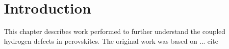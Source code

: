 \section{Introduction}
\label{sec:perovskites-introduction}

This chapter describes work performed to further understand the coupled hydrogen defects in perovskites.
The original work was based on ... cite


\placeholder
